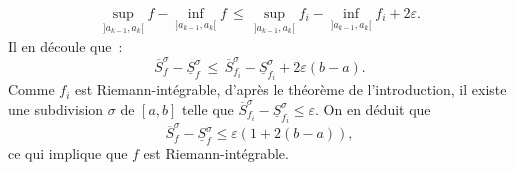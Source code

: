 {\begin{enumerate}
{\begin{eqnarray*}
\sup_{]a_{k-1}, a_{k}[}f - \inf_{]a_{k-1}, a_{k}[}f\,\leq\,
\sup_{]a_{k-1}, a_{k}[}f_{i} - \inf_{]a_{k-1}, a_{k}[}f_{i} +
2\varepsilon.
\end{eqnarray*}
Il en d\'ecoule que~:
\begin{equation*}
\overline{S}_{f}^{\sigma} - \underline{S}_{f}^{\sigma}\, \leq\,
\overline{S}_{f_{i}}^{\sigma} - \underline{S}_{f_{i}}^{\sigma} +
2\varepsilon (b- a).
\end{equation*}
Comme $f_{i}$ est Riemann-int\'egrable, d'apr\`es le th\'eor\`eme
de l'introduction, il existe une subdivision $\sigma$ de $[a, b]$ telle que
$\overline{S}_{f_{i}}^{\sigma} - \underline{S}_{f_{i}}^{\sigma}
\leq \varepsilon$. On en d\'eduit que
\begin{equation*}
\overline{S}_{f}^{\sigma} - \underline{S}_{f}^{\sigma} \leq
\varepsilon \left(1 + 2(b-a)\right),
\end{equation*}
ce qui implique que $f$ est Riemann-int\'egrable.}
\end{enumerate}
}